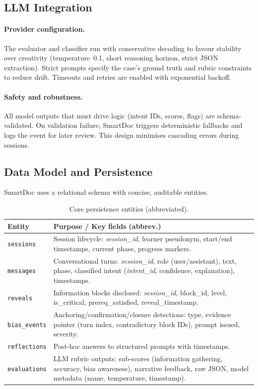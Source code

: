 \subsection{LLM Integration}
\label{sec:llm_integration}

\paragraph{Provider configuration.}
The evaluator and classifier run with conservative decoding to favour stability
over creativity (temperature~0.1, short reasoning horizon, strict JSON extraction).
Strict prompts specify the case’s ground truth and rubric constraints to reduce
drift. Timeouts and retries are enabled with exponential backoff.

\paragraph{Safety and robustness.}
All model outputs that must drive logic (intent IDs, scores, flags) are schema-validated.
On validation failure, SmartDoc triggers deterministic fallbacks and logs the event
for later review. This design minimises cascading errors during sessions.

\subsection{Data Model and Persistence}
\label{sec:data_model}

SmartDoc uses a relational schema with concise, auditable entities.

\begin{table}[h]
\centering
\caption{Core persistence entities (abbreviated).}
\label{tab:entities}
\setlength{\tabcolsep}{6pt}
\renewcommand{\arraystretch}{1.12}
\begin{tabular}{p{3.0cm} p{10.2cm}}
\toprule
\textbf{Entity} & \textbf{Purpose / Key fields (abbrev.)} \\
\midrule
\texttt{sessions} &
Session lifecycle: \textit{session\_id}, learner pseudonym, start/end timestamps,
current phase, progress markers. \\[2pt]
\texttt{messages} &
Conversational turns: \textit{session\_id}, role (user/assistant), text, phase,
classified intent (\textit{intent\_id}, confidence, explanation), timestamps. \\[2pt]
\texttt{reveals} &
Information blocks disclosed: \textit{session\_id}, block\_id, level, is\_critical,
prereq\_satisfied, reveal\_timestamp. \\[2pt]
\texttt{bias\_events} &
Anchoring/confirmation/closure detections: type, evidence pointer (turn index,
contradictory block IDs), prompt issued, severity. \\[2pt]
\texttt{reflections} &
Post-hoc answers to structured prompts with timestamps. \\[2pt]
\texttt{evaluations} &
LLM rubric outputs: sub-scores (information gathering, accuracy, bias awareness),
narrative feedback, raw JSON, model metadata (name, temperature, timestamp). \\
\bottomrule
\end{tabular}
\end{table}

